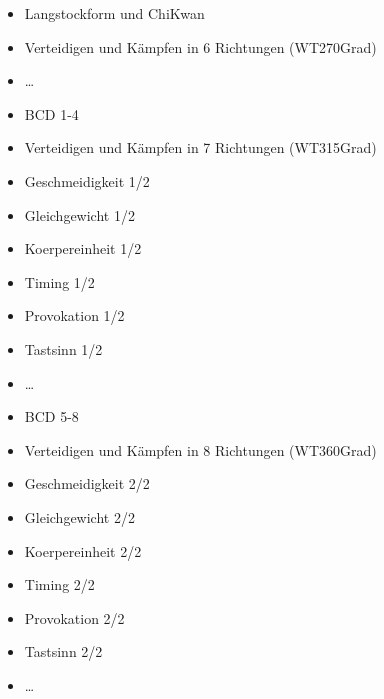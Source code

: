 \begin{WTGradTG}{6}

\begin{itemize}
	\item Langstockform und ChiKwan
	\item Verteidigen und K\"ampfen in 6 Richtungen (WT270Grad)
	\item \ldots
\end{itemize}

\end{WTGradTG}

\begin{WTGradTG}{7}

\begin{itemize}
	\item BCD 1-4
	\item Verteidigen und K\"ampfen in 7 Richtungen (WT315Grad)
	\item Geschmeidigkeit 1/2
	\item Gleichgewicht 1/2
	\item Koerpereinheit 1/2
	\item Timing 1/2
	\item Provokation 1/2
	\item Tastsinn 1/2
	\item \ldots
\end{itemize}

\end{WTGradTG}

\begin{WTGradTG}{8}

\begin{itemize}
	\item BCD 5-8
	\item Verteidigen und K\"ampfen in 8 Richtungen (WT360Grad)
	\item Geschmeidigkeit 2/2
	\item Gleichgewicht 2/2
	\item Koerpereinheit 2/2
	\item Timing 2/2
	\item Provokation 2/2
	\item Tastsinn 2/2
	\item \ldots
\end{itemize}

\end{WTGradTG}